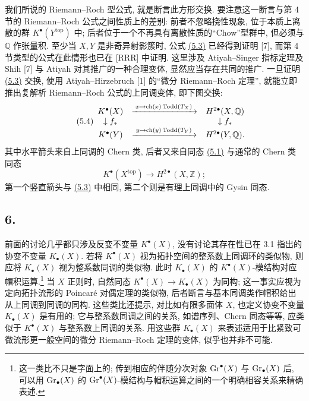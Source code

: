 我们所说的 Riemann--Roch 型公式, 就是断言此方形交换. 要注意这一断言与第 4 节的 Riemann--Roch 公式之间性质上的差别: 前者不忽略挠性现象, 位于本质上离散的群 $K^\bullet(Y^{\mathrm{top}})$ 中; 后者位于一个不再具有离散性质的“Chow”型群中, 但必须与 $\mathbb Q$ 作张量积. 至少当 $X,Y$ 是非奇异射影簇时, 公式 \hyperlink{sga6.e00.eq.5-3}{(5.3)} 已经得到证明 [7], 而第 4 节类型的公式在此情形也已在 [RRR] 中证明. 这里涉及 Atiyah--Singer 指标定理及 Shih [7] 与 Atiyah 对其推广的一种合理变体, 显然应当存在共同的推广. 一旦证明 \hyperlink{sga6.e00.eq.5-3}{(5.3)} 交换, 使用 Atiyah--Hirzebruch [1] 的“微分 Riemann--Roch 定理”, 就能立即推出复解析 Riemann--Roch 公式的上同调变体, 即下图交换:
\begin{equation}\tag{5.4}
\begin{array}{ccc}
K^\bullet(X) & \xrightarrow{\;x\mapsto \operatorname{ch}(x)\operatorname{Todd}(T_X)\;} & H^{2\bullet}(X,\mathbb Q) \\
\downarrow f_* && \downarrow f_* \\
K^\bullet(Y) & \xrightarrow{\;y\mapsto \operatorname{ch}(y)\operatorname{Todd}(T_Y)\;} & H^{2\bullet}(Y,\mathbb Q).
\end{array}
\end{equation}
其中水平箭头来自上同调的 Chern 类, 后者又来自同态 \hyperlink{sga6.e00.eq.5-1}{(5.1)} 与通常的 Chern 类同态
\[
K^\bullet(X^{\mathrm{top}})\longrightarrow H^{2\bullet}(X,\mathbb Z);
\]
第一个竖直箭头与 \hyperlink{sga6.e00.eq.5-3}{(5.3)} 中相同, 第二个则是有理上同调中的 Gysin 同态.

\subsection*{6.}
前面的讨论几乎都只涉及反变不变量 $K^\bullet(X)$, 没有讨论其存在性已在 3.1 指出的协变不变量 $K_\bullet(X)$. 若将 $K^\bullet(X)$ 视为拓扑空间的整系数上同调环的类似物, 则应将 $K_\bullet(X)$ 视为整系数同调的类似物. 此时 $K_\bullet(X)$ 的 $K^\bullet(X)$-模结构对应帽积运算.\footnote{这一类比不只是字面上的; 传到相应的伴随分次对象 $\operatorname{Gr}^\bullet(X)$ 与 $\operatorname{Gr}_\bullet(X)$ 后, 可以用 $\operatorname{Gr}_\bullet(X)$ 的 $\operatorname{Gr}^\bullet(X)$-模结构与帽积运算之间的一个明确相容关系来精确表述.} 当 $X$ 正则时, 自然同态 $K^\bullet(X)\to K_\bullet(X)$ 为同构; 这一事实应视为定向拓扑流形的 Poincaré 对偶定理的类似物, 后者断言与基本同调类作帽积给出从上同调到同调的同构. 这些类比还提示, 对比如有限多面体 $X$, 也定义协变不变量 $K_\bullet(X)$ 是有用的; 它与整系数同调之间的关系, 如谱序列、Chern 同态等等, 应类似于 $K^\bullet(X)$ 与整系数上同调的关系. 用这些群 $K_\bullet(X)$ 来表述适用于比紧致可微流形更一般空间的微分 Riemann--Roch 定理的变体, 似乎也并非不可能.


